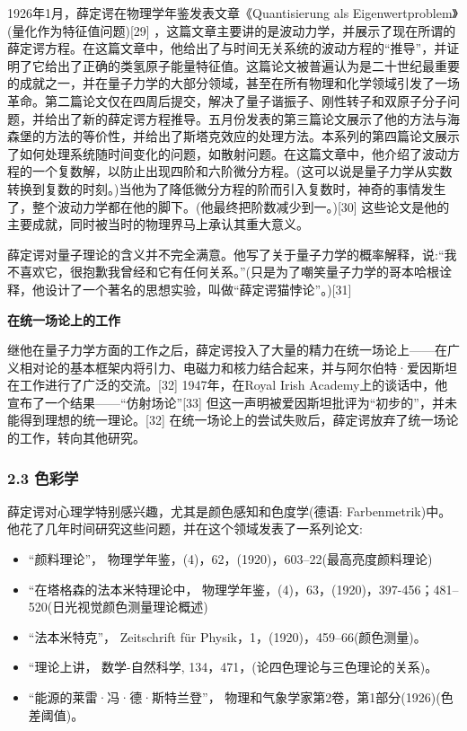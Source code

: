 1926年1月，薛定谔在物理学年鉴发表文章《Quantisierung als Eigenwertproblem》(量化作为特征值问题)[29] ，这篇文章主要讲的是波动力学，并展示了现在所谓的薛定谔方程。在这篇文章中，他给出了与时间无关系统的波动方程的“推导”，并证明了它给出了正确的类氢原子能量特征值。这篇论文被普遍认为是二十世纪最重要的成就之一，并在量子力学的大部分领域，甚至在所有物理和化学领域引发了一场革命。第二篇论文仅在四周后提交，解决了量子谐振子、刚性转子和双原子分子问题，并给出了新的薛定谔方程推导。五月份发表的第三篇论文展示了他的方法与海森堡的方法的等价性，并给出了斯塔克效应的处理方法。本系列的第四篇论文展示了如何处理系统随时间变化的问题，如散射问题。在这篇文章中，他介绍了波动方程的一个复数解，以防止出现四阶和六阶微分方程。(这可以说是量子力学从实数转换到复数的时刻。)当他为了降低微分方程的阶而引入复数时，神奇的事情发生了，整个波动力学都在他的脚下。(他最终把阶数减少到一。)[30] 这些论文是他的主要成就，同时被当时的物理界马上承认其重大意义。

薛定谔对量子理论的含义并不完全满意。他写了关于量子力学的概率解释，说:“我不喜欢它，很抱歉我曾经和它有任何关系。”(只是为了嘲笑量子力学的哥本哈根诠释，他设计了一个著名的思想实验，叫做“薛定谔猫悖论”。)[31]

\textbf{在统一场论上的工作}

继他在量子力学方面的工作之后，薛定谔投入了大量的精力在统一场论上——在广义相对论的基本框架内将引力、电磁力和核力结合起来，并与阿尔伯特·爱因斯坦在工作进行了广泛的交流。[32] 1947年，在Royal Irish Academy上的谈话中，他宣布了一个结果——“仿射场论”[33] 但这一声明被爱因斯坦批评为“初步的”，并未能得到理想的统一理论。[32] 在统一场论上的尝试失败后，薛定谔放弃了统一场论的工作，转向其他研究。

\subsubsection{2.3 色彩学}
薛定谔对心理学特别感兴趣，尤其是颜色感知和色度学(德语: Farbenmetrik)中。他花了几年时间研究这些问题，并在这个领域发表了一系列论文:
\begin{itemize}
\item “颜料理论”， 物理学年鉴，(4)，62，(1920)，603–22(最高亮度颜料理论)
\item “在塔格森的法本米特理论中， 物理学年鉴，(4)，63，(1920)，397-456；481–520(日光视觉颜色测量理论概述)
\item “法本米特克”， Zeitschrift für Physik，1，(1920)，459–66(颜色测量)。
\item “理论上讲， 数学-自然科学, 134，471，(论四色理论与三色理论的关系)。
\item “能源的莱雷·冯·德·斯特兰登”， 物理和气象学家第2卷，第1部分(1926)(色差阈值)。
\end{itemize}

